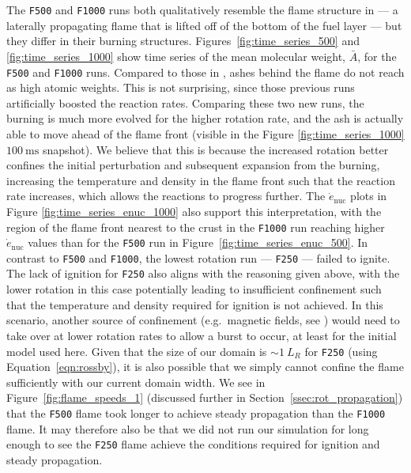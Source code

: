 \documentclass[preprint,times,tighten]{aastex63}
\begin{document}
The {\tt F500} and {\tt F1000} runs both qualitatively resemble the flame structure in 
\citet{flame_wave1} --- a laterally propagating flame that is lifted off of the bottom of the fuel 
layer --- but they differ in their burning structures. Figures~\ref{fig:time_series_500} and 
\ref{fig:time_series_1000} show time series of the mean molecular weight, $\bar{A}$, for the {\tt 
F500} and {\tt F1000} runs.  Compared to those in \cite{flame_wave1}, ashes behind the flame do not 
reach as high atomic weights. This is not surprising, since those previous runs artificially 
boosted the reaction rates.  Comparing these two new runs, the burning is much more evolved for the 
higher rotation rate, and the ash is actually able to move ahead of the flame front (visible in the 
Figure  \ref{fig:time_series_1000} $100~\mathrm{ms}$ snapshot). We believe that this is because the increased 
rotation better confines the initial perturbation and subsequent expansion from the burning, 
increasing the temperature and density in the flame front such that the reaction rate increases, 
which allows the reactions to progress further. The $\dot{e}_\mathrm{nuc}$ plots in Figure 
\ref{fig:time_series_enuc_1000} also support this interpretation, with the region of the 
flame front nearest to the crust in the {\tt F1000} run reaching higher $\dot{e}_\mathrm{nuc}$ values 
than for the {\tt F500} run in Figure~\ref{fig:time_series_enuc_500}. In contrast to {\tt F500} 
and {\tt F1000}, the lowest rotation run --- {\tt F250} --- failed to ignite. The lack of ignition 
for {\tt F250} also aligns with the reasoning given above, with the lower rotation in this case 
potentially leading to insufficient confinement such that the temperature and density required for 
ignition is not achieved. In this scenario, another source of confinement (e.g.\ magnetic fields, see \cite{art-2016-cavecchi-etal}) 
would need to take over at lower rotation rates to allow a burst to occur, at least for the initial 
model used here. Given that the size of our domain is $\sim 1~L_R$ for {\tt F250} (using Equation~\ref{eqn:rossby}), it is also possible that we simply cannot confine the flame sufficiently with our current domain width. We see in Figure~\ref{fig:flame_speeds_1} (discussed further in Section~\ref{ssec:rot_propagation}) that the {\tt F500} flame took longer to achieve steady propagation than the {\tt F1000} flame. It may therefore also be that we did not run our simulation for long enough to see the {\tt F250} flame achieve the conditions required for ignition and steady propagation.
\end{document}
